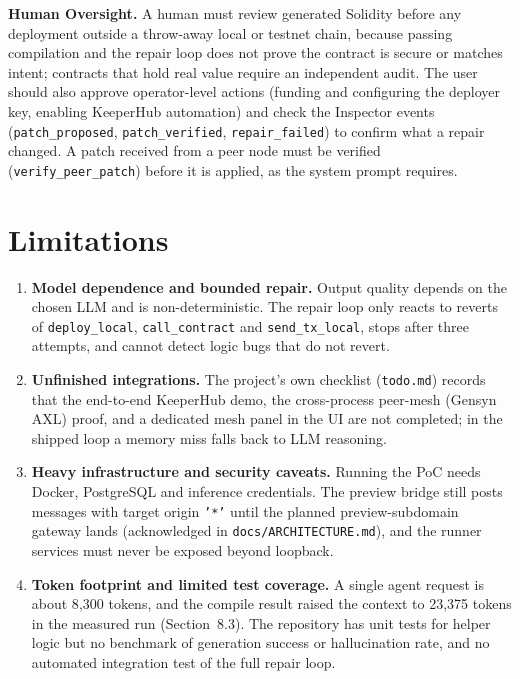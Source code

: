 \documentclass[11pt,letterpaper]{article}
\begin{document}
\medskip
\textbf{Human Oversight.} A human must review generated Solidity before any deployment outside a throw-away local or testnet chain, because passing compilation and the repair loop does not prove the contract is secure or matches intent; contracts that hold real value require an independent audit. The user should also approve operator-level actions (funding and configuring the deployer key, enabling KeeperHub automation) and check the Inspector events (\texttt{patch\_proposed}, \texttt{patch\_verified}, \texttt{repair\_failed}) to confirm what a repair changed. A patch received from a peer node must be verified (\texttt{verify\_peer\_patch}) before it is applied, as the system prompt requires.

\section{Limitations}
\begin{enumerate}[leftmargin=1.6em,itemsep=3pt]
  \item \textbf{Model dependence and bounded repair.} Output quality depends on the chosen LLM and is non-deterministic. The repair loop only reacts to reverts of \texttt{deploy\_local}, \texttt{call\_contract} and \texttt{send\_tx\_local}, stops after three attempts, and cannot detect logic bugs that do not revert.
  \item \textbf{Unfinished integrations.} The project's own checklist (\texttt{todo.md}) records that the end-to-end KeeperHub demo, the cross-process peer-mesh (Gensyn AXL) proof, and a dedicated mesh panel in the UI are not completed; in the shipped loop a memory miss falls back to LLM reasoning.
  \item \textbf{Heavy infrastructure and security caveats.} Running the PoC needs Docker, PostgreSQL and inference credentials. The preview bridge still posts messages with target origin \texttt{'*'} until the planned preview-subdomain gateway lands (acknowledged in \texttt{docs/ARCHITECTURE.md}), and the runner services must never be exposed beyond loopback.
  \item \textbf{Token footprint and limited test coverage.} A single agent request is about 8{,}300 tokens, and the compile result raised the context to 23{,}375 tokens in the measured run (Section~8.3). The repository has unit tests for helper logic but no benchmark of generation success or hallucination rate, and no automated integration test of the full repair loop.
\end{enumerate}
\end{document}

